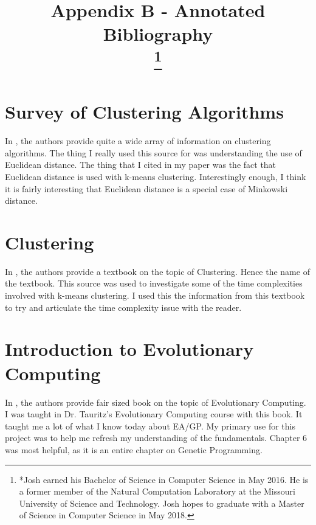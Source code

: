\documentclass[conference]{IEEEtran}
\begin{document}
\title{Appendix B - Annotated Bibliography\\
\thanks{*Josh earned his Bachelor of Science in Computer Science in May 2016.  He is a former member of the Natural Computation Laboratory at the Missouri University of Science and Technology.  Josh hopes to graduate with a Master of Science in Computer Science in May 2018.}
}

\author{
}

\maketitle

\onecolumn
\tableofcontents
\clearpage

\section{Survey of Clustering Algorithms}
In \cite{Xu2005},  the authors provide quite a wide array of information on clustering algorithms.  The thing I really used this source for was understanding the use of Euclidean distance.  The thing that I cited in my paper was the fact that Euclidean distance is used with k-means clustering.  Interestingly enough, I think it is fairly interesting that Euclidean distance is a special case of Minkowski distance.

\section{Clustering}
In \cite{XuRui2008}, the authors provide a textbook on the topic of Clustering.  Hence the name of the textbook.  This source was used to investigate some of the time complexities involved with k-means clustering.  I used this the information from this textbook to try and articulate the time complexity issue with the reader.

\section{Introduction to Evolutionary Computing}
In \cite{EibenAE2007}, the authors provide fair sized book on the topic of Evolutionary Computing.  I was taught in Dr. Tauritz's Evolutionary Computing course with this book.  It taught me a lot of what I know today about EA/GP.  My primary use for this project was to help me refresh my understanding of the fundamentals.  Chapter 6 was most helpful,  as it is an entire chapter on Genetic Programming.  
\end{document}
